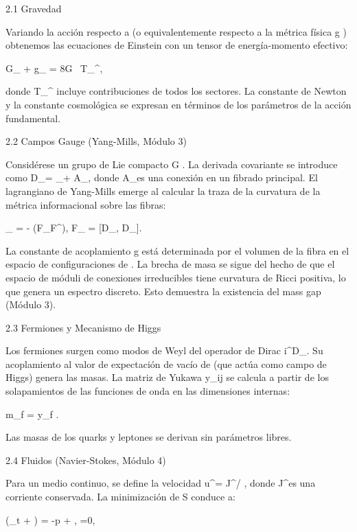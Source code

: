 \documentclass[12pt,a4paper]{book}
\begin{document}
2.1 Gravedad

Variando la acción respecto a  \rho  (o equivalentemente respecto a la métrica física  g ) obtenemos las ecuaciones de Einstein con un tensor de energía-momento efectivo:

G_{\mu\nu} + \Lambda g_{\mu\nu} = 8\pi G \, T_{\mu\nu}^{},

donde  T_{\mu\nu}^{}  incluye contribuciones de todos los sectores. La constante de Newton y la constante cosmológica se expresan en términos de los parámetros de la acción fundamental.

2.2 Campos Gauge (Yang-Mills, Módulo 3)

Considérese un grupo de Lie compacto  G . La derivada covariante se introduce como  D_\mu = \nabla_\mu + A_\mu , donde  A_\mu  es una conexión en un fibrado principal. El lagrangiano de Yang-Mills emerge al calcular la traza de la curvatura de la métrica informacional sobre las fibras:

_{} = -  (F_{\mu\nu}F^{\mu\nu}),
\quad F_{\mu\nu} = [D_\mu, D_\nu].

La constante de acoplamiento  g  está determinada por el volumen de la fibra en el espacio de configuraciones de  \rho . La brecha de masa se sigue del hecho de que el espacio de móduli de conexiones irreducibles tiene curvatura de Ricci positiva, lo que genera un espectro discreto. Esto demuestra la existencia del mass gap (Módulo 3).

2.3 Fermiones y Mecanismo de Higgs

Los fermiones surgen como modos de Weyl del operador de Dirac  i\gamma^\mu D_\mu . Su acoplamiento al valor de expectación de vacío de  \rho  (que actúa como campo de Higgs) genera las masas. La matriz de Yukawa  y_{ij}  se calcula a partir de los solapamientos de las funciones de onda en las dimensiones internas:

m_f = y_f \cdot \langle \rho \rangle.

Las masas de los quarks y leptones se derivan sin parámetros libres.

2.4 Fluidos (Navier-Stokes, Módulo 4)

Para un medio continuo, se define la velocidad  u^\mu = J^\mu / \rho , donde  J^\mu  es una corriente conservada. La minimización de  S  conduce a:

\rho (\partial_t  + \cdot\nabla{}) = -\nabla p + \nu \Delta {},
\quad \nabla\cdot{}=0,
\end{document}
